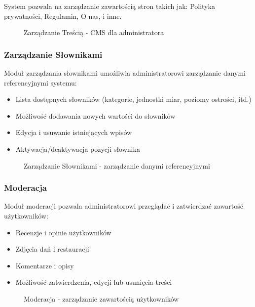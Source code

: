 \documentclass[12pt,a4paper,utf-8]{article}
\begin{document}
System pozwala na zarządzanie zawartością stron takich jak: Polityka prywatności, Regulamin, O nas, i inne.

\begin{figure}[H]
    \centering
    \caption{Zarządzanie Treścią  -  CMS dla administratora}
    \label{fig:content_management}
\end{figure}

\subsubsection{Zarządzanie Słownikami}

Moduł zarządzania słownikami umożliwia administratorowi zarządzanie danymi referencyjnymi systemu:

\begin{itemize}
    \item Lista dostępnych słowników (kategorie, jednostki miar, poziomy ostrości, itd.)
    \item Możliwość dodawania nowych wartości do słowników
    \item Edycja i usuwanie istniejących wpisów
    \item Aktywacja/deaktywacja pozycji słownika
\end{itemize}

\begin{figure}[H]
    \centering
    \caption{Zarządzanie Słownikami  -  zarządzanie danymi referencyjnymi}
    \label{fig:dictionaries}
\end{figure}

\subsubsection{Moderacja}

Moduł moderacji pozwala administratorowi przeglądać i zatwierdzać zawartość użytkowników:

\begin{itemize}
    \item Recenzje i opinie użytkowników
    \item Zdjęcia dań i restauracji
    \item Komentarze i opisy
    \item Możliwość zatwierdzenia, edycji lub usunięcia treści
\end{itemize}

\begin{figure}[H]
    \centering
    \caption{Moderacja  -  zarządzanie zawartością użytkowników}
    \label{fig:moderation}
\end{figure}
\end{document}
